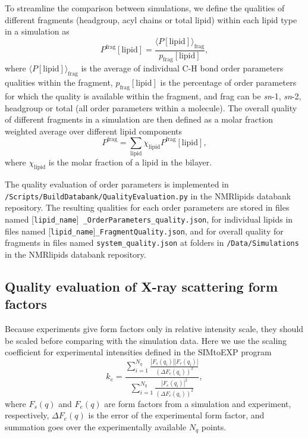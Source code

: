 \documentclass[fleqn,10pt]{wlscirep}
\begin{document}
To streamline the comparison between simulations, we define the qualities of different fragments (headgroup, acyl chains or total lipid) within each lipid type in a simulation as
\begin{equation}
    P^\mathrm{frag}[\mathrm{lipid}] = \frac{\langle P[\mathrm{lipid}]\rangle_\mathrm{frag}}{p_\mathrm{frag}[\mathrm{lipid}]},
\end{equation}
where $\langle P[\mathrm{lipid}]\rangle_\mathrm{frag}$ is the average of individual C-H bond order parameters qualities within the fragment, $p_\mathrm{frag}[\mathrm{lipid}]$ is the percentage of order parameters for which the quality is available within the fragment, and frag can be \textit{sn}-1, \textit{sn}-2, headgroup or total (all order parameters within a molecule). The overall quality of different fragments in a simulation are then defined as a molar fraction weighted average over different lipid components
\begin{equation}
    P^\mathrm{frag} = \sum_\mathrm{lipid} \chi_\mathrm{lipid} P^\mathrm{frag}[\mathrm{lipid}],
\end{equation}
where $\chi_\mathrm{lipid}$ is the molar fraction of a lipid in the bilayer.

The quality evaluation of order parameters is implemented in \texttt{/Scripts/BuildDatabank/QualityEvaluation.py} in the NMRlipids databank repository. The resulting qualities for each order parameters are stored in files named  [\texttt{lipid\_name}]\texttt{ \_OrderParameters\_quality.json}, for individual lipids in files named [\texttt{lipid\_name}]\texttt{\_FragmentQuality.json}, and for overall quality for fragments in files named \texttt{system\_quality.json} at folders in \texttt{/Data/Simulations} in the NMRlipids databank repository. 


\subsection{Quality evaluation of X-ray scattering form factors}
Because experiments give form factors only in relative intensity scale, they should be scaled before comparing with the simulation data. Here we use the scaling coefficient for experimental intensities defined in the SIMtoEXP program~\cite{kucerka10}
\begin{equation}
    k_e = \frac{\sum_{i=1}^{N_q} \frac{|F_s(q_i)||F_e(q_i)|}{(\Delta F_e(q_i))^2}}{\sum_{i=1}^{N_q} \frac{|F_e(q_i)|^2}{(\Delta F_e(q_i))^2}},
\end{equation}
where $F_s(q)$ and $F_e(q)$ are form factors from a simulation and experiment, respectively, $\Delta F_e(q)$ is the error of the experimental form factor, and summation goes over the experimentally available $N_q$ points. 
\end{document}
